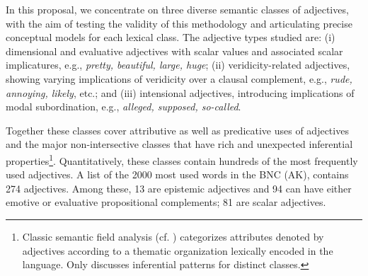 \documentclass[10pt]{article}
\begin{document}
In this proposal, we concentrate on three diverse semantic classes of adjectives, with the aim of testing the validity of this methodology and articulating precise conceptual models for each lexical class. The adjective types studied are: (i) dimensional and evaluative adjectives with scalar values and associated scalar implicatures, e.g., \textit{pretty, beautiful, large, huge}; (ii) veridicity-related adjectives, showing varying implications of veridicity over a clausal complement, e.g., \textit{rude, annoying, likely}, etc.; and (iii) intensional adjectives, introducing implications of modal subordination, e.g., \textit{alleged, supposed, so-called}. 

Together these classes cover attributive as well as predicative uses of adjectives and the major non-intersective classes that have rich and unexpected inferential properties\footnote{Classic semantic field analysis (cf. \cite{dixon:91,lyons:77,raskin1995lexical}) categorizes attributes denoted by adjectives according to a thematic organization lexically encoded in the language. Only \cite{raskin1995lexical} discusses inferential patterns for distinct classes.}. Quantitatively, these classes contain hundreds of the most frequently used adjectives. A list of the 2000 most used words in the BNC (AK), contains 274 adjectives. Among these, 13 are epistemic adjectives and 94 can have either emotive or evaluative propositional complements; 81 are scalar adjectives. 

\end{document}
